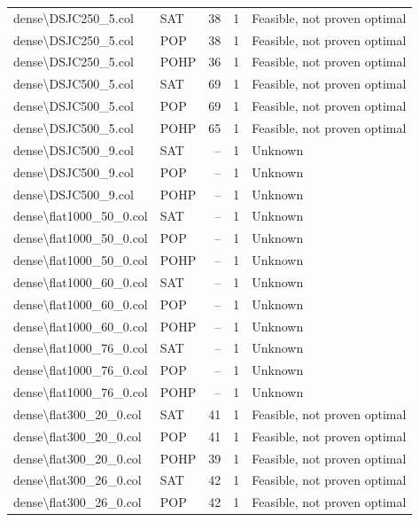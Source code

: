 \begin{longtable}{llrrl}
dense\textbackslash{}DSJC250\_5.col & SAT & 38 & 1 & Feasible, not proven optimal \\
dense\textbackslash{}DSJC250\_5.col & POP & 38 & 1 & Feasible, not proven optimal \\
dense\textbackslash{}DSJC250\_5.col & POHP & 36 & 1 & Feasible, not proven optimal \\
dense\textbackslash{}DSJC500\_5.col & SAT & 69 & 1 & Feasible, not proven optimal \\
dense\textbackslash{}DSJC500\_5.col & POP & 69 & 1 & Feasible, not proven optimal \\
dense\textbackslash{}DSJC500\_5.col & POHP & 65 & 1 & Feasible, not proven optimal \\
dense\textbackslash{}DSJC500\_9.col & SAT & -- & 1 & Unknown \\
dense\textbackslash{}DSJC500\_9.col & POP & -- & 1 & Unknown \\
dense\textbackslash{}DSJC500\_9.col & POHP & -- & 1 & Unknown \\
dense\textbackslash{}flat1000\_50\_0.col & SAT & -- & 1 & Unknown \\
dense\textbackslash{}flat1000\_50\_0.col & POP & -- & 1 & Unknown \\
dense\textbackslash{}flat1000\_50\_0.col & POHP & -- & 1 & Unknown \\
dense\textbackslash{}flat1000\_60\_0.col & SAT & -- & 1 & Unknown \\
dense\textbackslash{}flat1000\_60\_0.col & POP & -- & 1 & Unknown \\
dense\textbackslash{}flat1000\_60\_0.col & POHP & -- & 1 & Unknown \\
dense\textbackslash{}flat1000\_76\_0.col & SAT & -- & 1 & Unknown \\
dense\textbackslash{}flat1000\_76\_0.col & POP & -- & 1 & Unknown \\
dense\textbackslash{}flat1000\_76\_0.col & POHP & -- & 1 & Unknown \\
dense\textbackslash{}flat300\_20\_0.col & SAT & 41 & 1 & Feasible, not proven optimal \\
dense\textbackslash{}flat300\_20\_0.col & POP & 41 & 1 & Feasible, not proven optimal \\
dense\textbackslash{}flat300\_20\_0.col & POHP & 39 & 1 & Feasible, not proven optimal \\
dense\textbackslash{}flat300\_26\_0.col & SAT & 42 & 1 & Feasible, not proven optimal \\
dense\textbackslash{}flat300\_26\_0.col & POP & 42 & 1 & Feasible, not proven optimal \\

\end{longtable}
